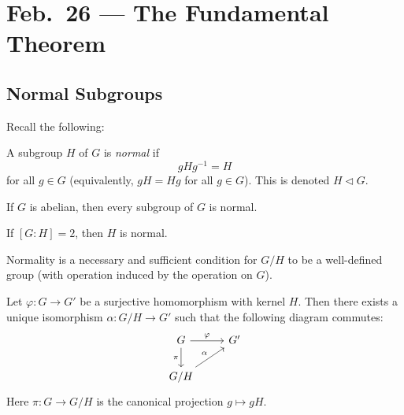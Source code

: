 \chapter{Feb.~26 --- The Fundamental Theorem}

\section{Normal Subgroups}

Recall the following:

\begin{definition}
  A subgroup $H$ of $G$ is \emph{normal} if
  \[
    gHg^{-1} = H
  \]
  for all $g \in G$ (equivalently, $gH = Hg$ for all
  $g \in G$). This is denoted $H \triangleleft G$.
\end{definition}

\begin{remark}
  If $G$ is abelian, then every subgroup of $G$ is normal.
\end{remark}

\begin{exercise}
  If $[G : H] = 2$, then $H$ is normal.
\end{exercise}

\begin{remark}
  Normality is a necessary and sufficient condition for
  $G / H$ to be a well-defined group (with operation
  induced by the operation on $G$).
\end{remark}

\begin{theorem}
  Let $\varphi : G \to G'$ be a surjective homomorphism
  with kernel $H$. Then there exists a unique isomorphism
  $\alpha : G / H \to G'$ such that the following diagram
  commutes:
  \[
    \begin{tikzcd}
      G \arrow{r}{\varphi} \arrow[swap]{d}{\pi}
      & G' \\
      G / H \arrow{ur}{\alpha}
    \end{tikzcd}
  \]
  Here $\pi : G \to G / H$ is the canonical projection
  $g \mapsto gH$.
\end{theorem}

